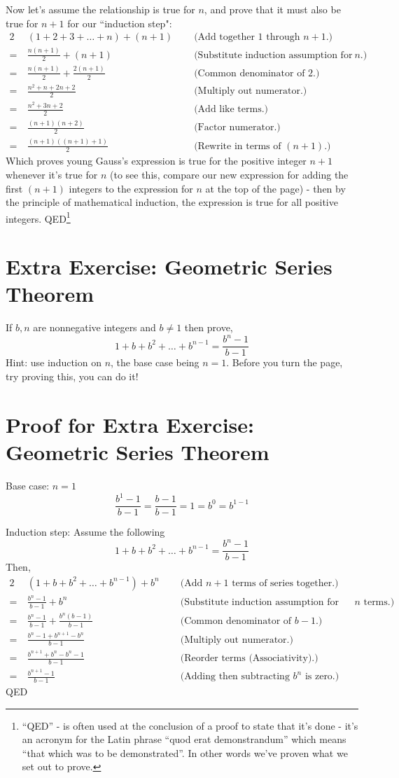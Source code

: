 \documentclass{article}
\begin{document}
Now let's assume the relationship is true for $n$,
and prove that it must also be true for $n+1$ for our ``induction step":
\begin{alignat*}{2}
&(1+2+3+\ldots+n) + (n+1) \;\;  &&\text{(Add together 1 through }n+1\text{.)}\\
=\ &\frac{n(n+1)}{2} + (n+1) &&\text{(Substitute induction assumption for 1 through }n\text{.)}\\
=\ &\frac{n(n+1)}{2} + \frac{2(n+1)}{2} &&\text{(Common denominator of 2.)}\\
=\ &\frac{n^2+n+2n+2}{2} &&\text{(Multiply out numerator.)}\\
=\ &\frac{n^2+3n+2}{2} &&\text{(Add like terms.)}\\
=\ &\frac{(n+1)(n+2)}{2} &&\text{(Factor numerator.)}\\
=\ &\frac{(n+1)((n+1)+1)}{2} &&\text{(Rewrite in terms of }(n+1)\text{.)}
\end{alignat*}
Which proves young Gauss's expression is true for
the positive integer $n+1$ whenever it's true for $n$ (to see this, compare
our new expression for adding the first $(n+1)$ integers
to the expression for $n$ at the top
of the page) - then
by the principle of mathematical induction,
the expression is true for all positive integers. QED\footnote{``QED'' - is
often used at the conclusion of a proof to state that it's
done - it's an acronym for the Latin phrase
``quod erat demonstrandum'' which means ``that which was to be demonstrated''.
In other words we've proven what we set out to prove.}

\section*{Extra Exercise: Geometric Series Theorem}
If $b, n$ are nonnegative integers and $b\ne1$ then prove,
\[1+b+b^2+\dots+b^{n-1} = \frac{b^n-1}{b-1}\]
Hint: use induction on $n$, the base case being $n=1$.  Before you turn the page, try proving this, you can do it!

\section*{Proof for Extra Exercise: Geometric Series Theorem}
Base case: $n=1$
\[\frac{b^1-1}{b-1}=\frac{b-1}{b-1}=1=b^0=b^{1-1}\]

Induction step:
Assume the following
\[1+b+b^2+\dots+b^{n-1} = \frac{b^n-1}{b-1}\]
Then,
\begin{alignat*}{2}
&(1+b+b^2+\dots+b^{n-1}) + b^n  \;\;  &&\text{(Add }n+1\text{ terms of series together.)}\\
=\ &\frac{b^n-1}{b-1}+b^n &&\text{(Substitute induction assumption for first }n\text{ terms.)}\\
=\ &\frac{b^n-1}{b-1}+\frac{b^n(b-1)}{b-1}  &&\text{(Common denominator of }b-1\text{.)}\\
=\ &\frac{b^n-1+b^{n+1}-b^n}{b-1} &&\text{(Multiply out numerator.)}\\
=\ &\frac{b^{n+1}+b^n-b^n-1}{b-1} &&\text{(Reorder terms (Associativity).)}\\
=\ &\frac{b^{n+1}-1}{b-1} &&\text{(Adding then subtracting }b^n\text{ is zero.)}
\end{alignat*}
QED
\end{document}
